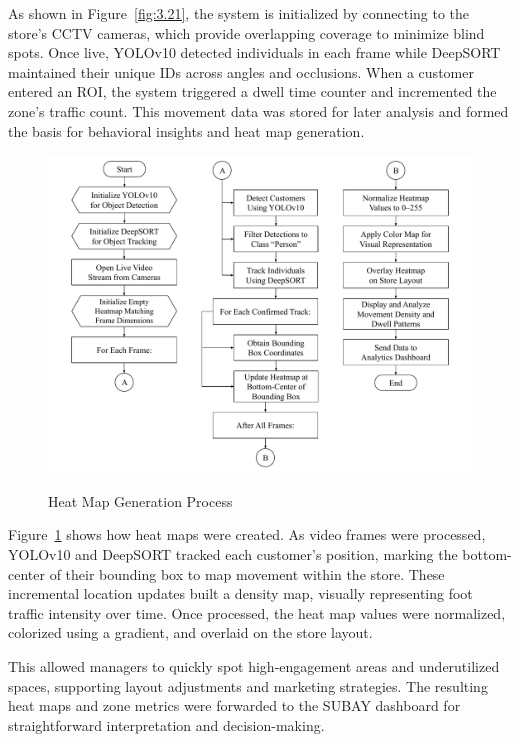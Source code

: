 {As shown in Figure~\ref{fig:3.21}, the system is initialized by connecting to the store’s CCTV cameras, which provide overlapping coverage to minimize blind spots. Once live, YOLOv10 detected individuals in each frame while DeepSORT maintained their unique IDs across angles and occlusions. When a customer entered an ROI, the system triggered a dwell time counter and incremented the zone’s traffic count. This movement data was stored for later analysis and formed the basis for behavioral insights and heat map generation.

\begin{figure}[H]
	\caption[Heat Map Generation Process]{\newline \newline Heat Map Generation Process}
	\centering
	\includegraphics[width=1\linewidth]{figs/3.22.pdf}
	\label{fig:3.22}
\end{figure}

Figure~\ref{fig:3.22} shows how heat maps were created. As video frames were processed, YOLOv10 and DeepSORT tracked each customer's position, marking the bottom-center of their bounding box to map movement within the store. These incremental location updates built a density map, visually representing foot traffic intensity over time. Once processed, the heat map values were normalized, colorized using a gradient, and overlaid on the store layout.

This allowed managers to quickly spot high-engagement areas and underutilized spaces, supporting layout adjustments and marketing strategies. The resulting heat maps and zone metrics were forwarded to the SUBAY dashboard for straightforward interpretation and decision-making.

}
